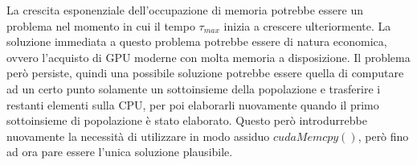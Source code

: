 La crescita esponenziale dell'occupazione di memoria potrebbe essere un
problema nel momento in cui il tempo $\tau_{max}$ inizia a crescere
ulteriormente. La soluzione immediata a questo problema potrebbe essere di
natura economica, ovvero l'acquisto di GPU moderne con molta memoria a
disposizione. Il problema però persiste, quindi una possibile soluzione
potrebbe essere quella di computare ad un certo punto solamente un sottoinsieme
della popolazione e trasferire i restanti elementi sulla CPU, per poi
elaborarli nuovamente quando il primo sottoinsieme di popolazione è stato
elaborato. Questo però introdurrebbe nuovamente la necessità di utilizzare
in modo assiduo $cudaMemcpy()$, però fino ad ora pare essere l'unica soluzione
plausibile.
